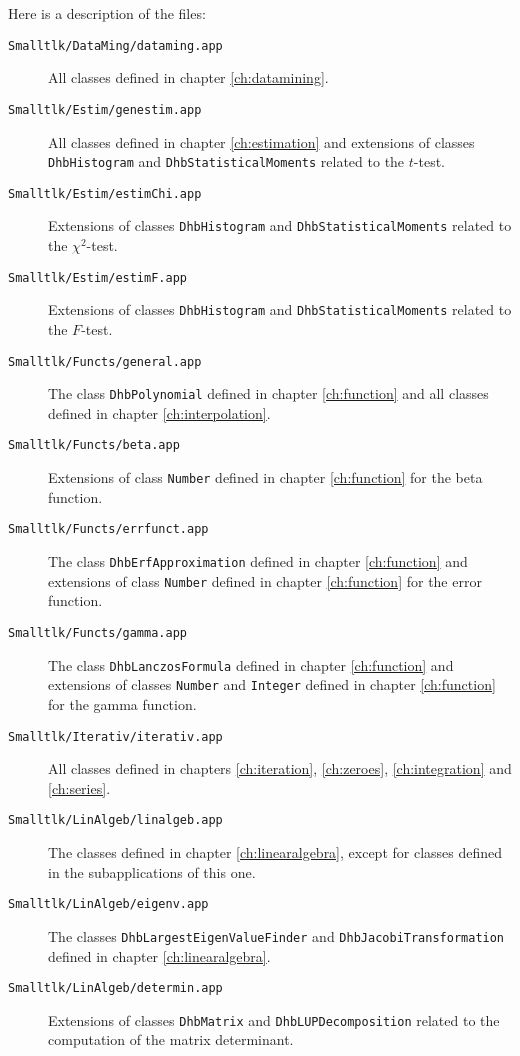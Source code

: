 \documentclass[twoside]{book}
\begin{document}
\noindent Here is a description of the files:
\begin{description}
  \item[\tt Smalltlk/DataMing/dataming.app] All classes defined in chapter \ref{ch:datamining}.
  \item[\tt Smalltlk/Estim/genestim.app] All classes defined in chapter \ref{ch:estimation} and
     extensions of classes {\tt DhbHistogram} and
     {\tt DhbStatisticalMoments} related to the $t$-test.
  \item[\tt Smalltlk/Estim/estimChi.app] Extensions of classes {\tt DhbHistogram} and
     {\tt DhbStatisticalMoments} related to the $\chi^2$-test.
  \item[\tt Smalltlk/Estim/estimF.app] Extensions of classes {\tt DhbHistogram} and
     {\tt DhbStatisticalMoments} related to the $F$-test.
  \item[\tt Smalltlk/Functs/general.app] The class {\tt DhbPolynomial} defined
     in chapter \ref{ch:function} and all classes defined in chapter \ref{ch:interpolation}.
  \item[\tt Smalltlk/Functs/beta.app] Extensions of class {\tt Number} defined
     in chapter \ref{ch:function} for the beta function.
  \item[\tt Smalltlk/Functs/errfunct.app] The class {\tt DhbErfApproximation} defined
     in chapter \ref{ch:function} and extensions of class {\tt Number} defined
     in chapter \ref{ch:function} for the error function.
  \item[\tt Smalltlk/Functs/gamma.app] The class {\tt DhbLanczosFormula} defined
     in chapter \ref{ch:function} and extensions of classes {\tt Number} and {\tt Integer} defined
     in chapter \ref{ch:function} for the gamma function.
  \item[\tt Smalltlk/Iterativ/iterativ.app] All classes defined in chapters \ref{ch:iteration},
     \ref{ch:zeroes}, \ref{ch:integration} and \ref{ch:series}.
  \item[\tt Smalltlk/LinAlgeb/linalgeb.app] The classes defined in chapter \ref{ch:linearalgebra},
   except for classes defined in the subapplications of this one.
  \item[\tt Smalltlk/LinAlgeb/eigenv.app] The classes {\tt DhbLargestEigenValueFinder}
  and {\tt DhbJacobiTransformation} defined in chapter \ref{ch:linearalgebra}.
  \item[\tt Smalltlk/LinAlgeb/determin.app] Extensions of classes {\tt DhbMatrix} and
     {\tt DhbLUPDecomposition} related to the computation of the matrix determinant.

\end{description}
\end{document}
